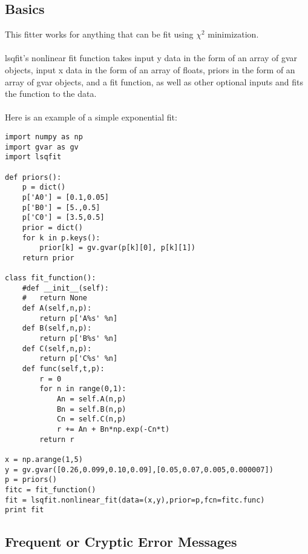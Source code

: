 \documentclass[english,course,headertitle,theoremsection,nocleardoublepage,twoside,onecolumn]{Notes}
\begin{document}
\subsection{Basics}
This fitter works for anything that can be fit using $\chi^{2}$ minimization.\\
\\
lsqfit's nonlinear fit function takes input y data in the form of an array of gvar objects, input x data in the form of an array of floats, priors in the form of an array of gvar objects, and a fit function, as well as other optional inputs and fits the function to the data.\\
\\
Here is an example of a simple exponential fit:
\begin{lstlisting}
import numpy as np
import gvar as gv
import lsqfit

def priors(): 
	p = dict()
	p['A0'] = [0.1,0.05]
	p['B0'] = [5.,0.5]
	p['C0'] = [3.5,0.5]
	prior = dict()
	for k in p.keys():
		prior[k] = gv.gvar(p[k][0], p[k][1])
	return prior

class fit_function():
	#def __init__(self):
	#	return None
	def A(self,n,p):
		return p['A%s' %n] 
	def B(self,n,p):
		return p['B%s' %n] 
	def C(self,n,p):
		return p['C%s' %n] 
	def func(self,t,p):
		r = 0
		for n in range(0,1):
			An = self.A(n,p)
			Bn = self.B(n,p)
			Cn = self.C(n,p)
			r += An + Bn*np.exp(-Cn*t)
		return r

x = np.arange(1,5) 
y = gv.gvar([0.26,0.099,0.10,0.09],[0.05,0.07,0.005,0.000007])
p = priors()
fitc = fit_function()
fit = lsqfit.nonlinear_fit(data=(x,y),prior=p,fcn=fitc.func)
print fit
\end{lstlisting}

\subsection{Frequent or Cryptic Error Messages}
\end{document}
